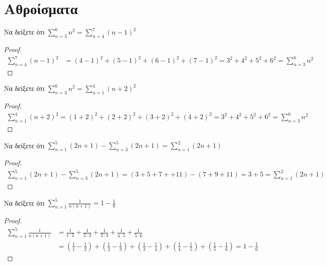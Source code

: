 \documentclass[main.tex]{subfiles}
\begin{document}
\section{Αθροίσματα}


\begin{example}
    Να δείξετε ότι $ \sum_{n=3}^{6} n^{2} = \sum_{n=4}^{7} (n-1)^{2}   $
\end{example}

\begin{proof}
    \begin{align*}
        \sum_{n=4}^{7} (n-1)^{2} &= (4-1)^{2}+(5-1)^{2}+(6-1)^{2}+(7-1)^{2} 
        = 3^{2}+4^{2}+5^{2}+6^{2} = \sum_{n=3}^{6} n^{2} 
    \end{align*}
\end{proof}

\begin{example}
    Να δείξετε ότι $ \sum_{n=3}^{6} n^{2} = \sum_{n=1}^{4} (n+2)^{2}   $
\end{example}

\begin{proof}
    \begin{align*}
        \sum_{n=1}^{4} (n+2)^{2} = (1+2)^{2}+(2+2)^{2}+(3+2)^{2}+(4+2)^{2}=
        3^{2}+4^{2}+5^{2}+6^{2} = \sum_{n=3}^{6} n^{2} 
    \end{align*}
\end{proof}

\begin{example}
    Να δείξετε ότι $ \sum_{n=1}^{5} (2n+1) - \sum_{n=3}^{5} (2n+1)  =  
    \sum_{n=1}^{2} (2n+1) $
\end{example}

\begin{proof}
    \begin{align*}
        \sum_{n=1}^{5} (2n+1)- \sum_{n=3}^{5} (2n+1) = 
        (3+5+7++11) - (7+9+11) = 3 + 5 = \sum_{n=1}^{2} (2n+1) 
    \end{align*}
\end{proof}

\begin{example}
    Να δείξετε ότι $ \sum_{n=1}^{5} \frac{1}{n(n+1)} = 1 - \frac{1}{6}  $
\end{example}

\begin{proof}
    \begin{align*}
        \sum_{n=1}^{5} \frac{1}{n(n+1)} 
        &= \frac{1}{1\cdot 2} + \frac{1}{2 \cdot 3} + \frac{1}{3 \cdot 4} 
        + \frac{1}{4 \cdot 5} + \frac{1}{5 \cdot 6} \\
        &= \left(\frac{1}{1} - \frac{1}{2}\right) + \left(\frac{1}{2} 
        - \frac{1}{3} \right) + \left(\frac{1}{3} - \frac{1}{4}\right) 
        + \left(\frac{1}{4} - \frac{1}{5}\right) +
        \left(\frac{1}{5} - \frac{1}{6}\right)  = 1 - \frac{1}{6}
    \end{align*}
\end{proof}
\end{document}
